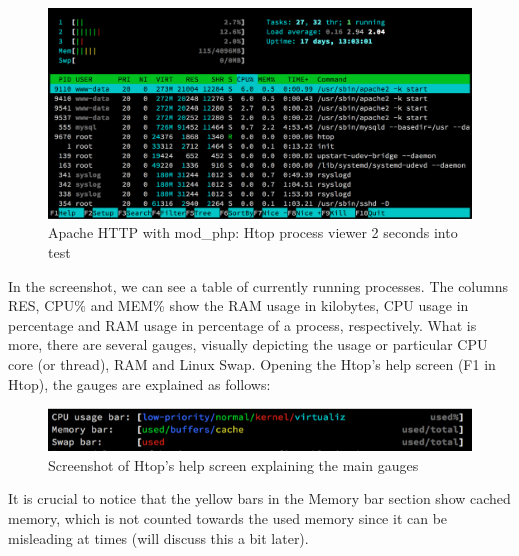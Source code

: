 \begin{figure}[H]
\begin{center}
\includegraphics[scale=0.5]{figures/Apache_mod_php_2s.png}
\caption{Apache HTTP with mod\_php: Htop process viewer 2 seconds into test}
\label{fig:apache_mod_php_2s}
\end{center}
\end{figure}

In the screenshot, we can see a table of currently running processes. The columns RES, CPU\% and MEM\% show the RAM usage in kilobytes, CPU usage in percentage and RAM usage in percentage of a process, respectively. What is more, there are several gauges, visually depicting the usage or particular CPU core (or thread), RAM and Linux Swap. Opening the Htop's help screen (F1 in Htop), the gauges are explained as follows:

\begin{figure}[H]
\begin{center}
\includegraphics{figures/htop_help_gauges.png}
\caption{Screenshot of Htop's help screen explaining the main gauges}
\label{fig:htop_help_gauges}
\end{center}
\end{figure}

It is crucial to notice that the yellow bars in the Memory bar section show cached memory, which is not counted towards the used memory since it can be misleading at times (will discuss this a bit later).

